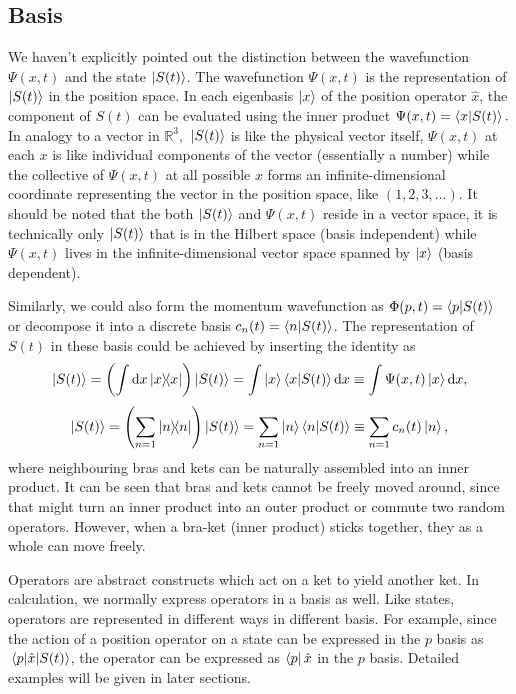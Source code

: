 \documentclass{article}
\theoremstyle{nonumberplain}
\begin{document}
\subsection{Basis}
We haven't explicitly pointed out the distinction between the wavefunction $\Psi(x,t)$ and the state $\ket{S(t)}$. The wavefunction $\Psi (x,t)$ is the representation of $\ket{S(t)}$ in the position space. In each eigenbasis $\ket{x}$ of the position operator $\hat{x}$, the component of $S(t)$ can be evaluated using the inner product $\Psi(x,t) = \braket{x}{S(t)}.$ In analogy to a vector in $\mathbb{R}^3,$ $\ket{S(t)}$ is like the physical vector itself, $\Psi(x,t)$ at each $x$ is like individual components of the vector (essentially a number) while the collective of $\Psi(x,t)$ at all possible $x$ forms an infinite-dimensional coordinate representing the vector in the position space, like $(1,2,3, \ldots  )$. It should be noted that the both $\ket{S(t)}$ and $\Psi (x,t)$ reside in a vector space, it is technically only $\ket{S(t)}$ that is in the Hilbert space (basis independent) while $\Psi(x,t)$ lives in the infinite-dimensional vector space spanned by $\ket{x}$ (basis dependent). 

Similarly, we could also form the momentum wavefunction as $\Phi (p,t) = \braket{p}{S(t)}$ or decompose it into a discrete basis $c_n(t) = \braket{n}{S(t)}$. The representation of $S(t)$ in these basis could be achieved by inserting the identity as 
\[
    \ket{S(t)} =  \left(\int \mathrm{d} x \dyad{x} {x}  \right) \ket{S(t)} 
    = \int \ket{x} \braket{x}{S(t)} \mathrm{d} x 
    \equiv \int \Psi (x,t) \ket{x} \mathrm{d} x,
\]
\[
    \ket{S(t)} = \left( \sum\limits_{n=1} \dyad{n} \right) \ket{S(t)}
    = \sum_{n=1} \ket{n} \braket{n}{S(t)} 
    \equiv \sum_{n=1} c_n(t) \ket{n},
\]
where neighbouring bras and kets can be naturally assembled into an inner product. It can be seen that bras and kets cannot be freely moved around, since that might turn an inner product into an outer product or commute two random operators. However, when a bra-ket (inner product) sticks together, they as a whole can move freely. 

Operators are abstract constructs which act on a ket to yield another ket. In calculation, we normally express operators in a basis as well. Like states, operators are represented in different ways in different basis. For example, since the action of a position operator on a state can be expressed in the $p$ basis as $\mel{p}{\hat{x} }{S(t)}$, the operator can be expressed as $\bra{p}{\hat{x}}$ in the $p$ basis. Detailed examples will be given in later sections. 
\end{document}
